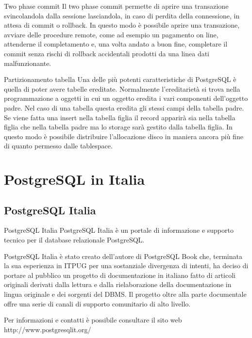 \documentclass{beamer}
\begin{document}
\begin{frame}{Two phase commit}
 Il two phase commit permette di aprire una transazione svincolandola dalla sessione lasciandola, in caso di perdita della connessione, in attesa di commit o rollback.
\newline
\pause In questo modo è possibile aprire una transazione, avviare delle procedure remote, come ad esempio un pagamento on  line, attenderne il completamento e, una volta andato a buon fine, completare il commit senza rischi di rollback accidentali prodotti da una linea dati malfunzionante.
\end{frame}

\begin{frame}{Partizionamento tabella}
 Una delle più potenti caratteristiche di PostgreSQL è quella di poter
avere tabelle ereditate.
\newline
\pause Normalmente l'ereditarietà si trova nella programmazione a oggetti
in cui un oggetto eredita i vari componenti dell'oggetto padre.
\newline
\pause Nel caso di una tabella questa eredita gli stessi campi della tabella
padre. Se viene fatta una insert nella tabella figlia il record apparirà
sia nella tabella figlia che nella tabella padre ma lo storage sarà
gestito dalla tabella figlia.
\newline
\pause In questo modo è possibile distribuire l'allocazione disco in maniera
ancora più fine di quanto permesso dalle tablespace.
\end{frame}



\section{PostgreSQL in Italia}

\subsection{PostgreSQL Italia}
\begin{frame}{PostgreSQL Italia}
PostgreSQL Italia è un portale di informazione e supporto tecnico per il database relazionale PostgreSQL.

PostgreSQL Italia è stato creato dell'autore di PostgreSQL Book che, terminata la sua esperienza in ITPUG per una sostanziale divergenza di intenti, ha deciso di portare al pubblico un progetto di documentazione in italiano fatto di articoli originali derivati dalla lettura e dalla rielaborazione della documentazione in lingua originale e dei sorgenti del DBMS.
Il progetto oltre alla parte documentale offre una serie di canali di supporto comunitario di alto livello.

Per informazioni e contatti è possibile consultare il sito web http://www.postgresqlit.org/
\end{frame}
\end{document}
